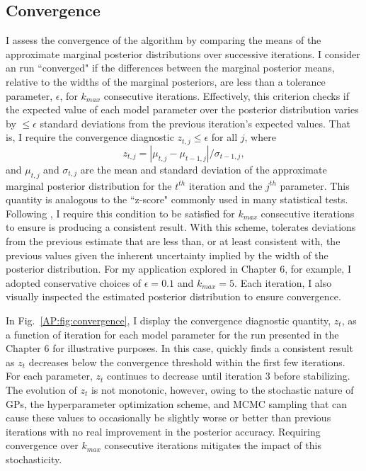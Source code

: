 \subsection{Convergence} \label{AP:sec:app:convergence}

I assess the convergence of the \approxposterior algorithm by comparing the means of the approximate marginal posterior distributions over successive iterations. I consider an \approxposterior run ``converged" if the differences between the marginal posterior means, relative to the widths of the marginal posteriors, are less than a tolerance parameter, $\epsilon$, for $k_{max}$ consecutive iterations. Effectively, this criterion checks if the expected value of each model parameter over the posterior distribution varies by ${\leq}{\epsilon}$ standard deviations from the previous iteration's expected values. That is, I require the \approxposterior convergence diagnostic $z_{t,j}{\leq}{\epsilon}$ for all $j$, where
\begin{equation}
    z_{t,j} = |\mu_{t,j} - \mu_{t-1,j}| / \sigma_{t-1,j},
\end{equation}
 and $\mu_{t,j}$ and $\sigma_{t,j}$ are the mean and standard deviation of the approximate marginal posterior distribution for the $t^{th}$ iteration and the $j^{th}$ parameter. This quantity is analogous to the ``z-score" commonly used in many statistical tests. Following \citet{Wang2018}, I require this condition to be satisfied for $k_{max}$ consecutive iterations to ensure \approxposterior is producing a consistent result. With this scheme, \approxposterior tolerates deviations from the previous estimate that are less than, or at least consistent with, the previous values given the inherent uncertainty implied by the width of the posterior distribution. For my application explored in Chapter 6, for example, I adopted conservative choices of $\epsilon = 0.1$ and $k_{max} = 5$. Each \approxposterior iteration, I also visually inspected the estimated posterior distribution to ensure convergence. 

In Fig.~\ref{AP:fig:convergence}, I display the convergence diagnostic quantity, $z_t$, as a function of iteration for each model parameter for the \approxposterior run presented in the Chapter 6 for illustrative purposes. In this case, \approxposterior quickly finds a consistent result as $z_t$ decreases below the convergence threshold within the first few iterations. For each parameter, $z_t$ continues to decrease until iteration 3 before stabilizing. The evolution of $z_t$ is not monotonic, however, owing to the stochastic nature of GPs, the hyperparameter optimization scheme, and MCMC sampling that can cause these values to occasionally be slightly worse or better than previous iterations with no real improvement in the posterior accuracy. Requiring convergence over $k_{max}$ consecutive iterations mitigates the impact of this stochasticity.


